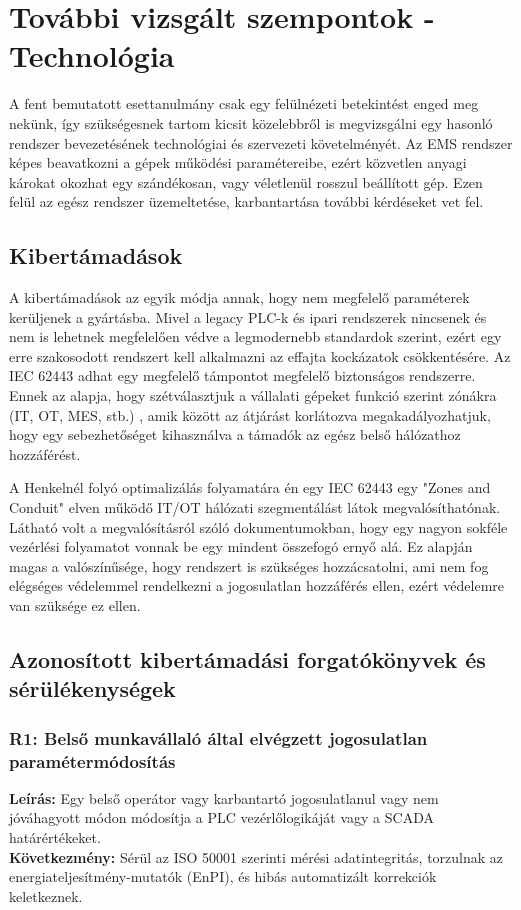 \section{További vizsgált szempontok - Technológia}
A fent bemutatott esettanulmány csak egy felülnézeti betekintést enged meg nekünk, így szükségesnek tartom kicsit közelebbről is megvizsgálni egy hasonló rendszer bevezetésének technológiai és szervezeti követelményét. Az EMS rendszer képes beavatkozni a gépek működési paramétereibe, ezért közvetlen anyagi károkat okozhat egy szándékosan, vagy véletlenül rosszul beállított gép. Ezen felül az egész rendszer üzemeltetése, karbantartása további kérdéseket vet fel.

\subsection*{Kibertámadások}
A kibertámadások az egyik módja annak, hogy nem megfelelő paraméterek kerüljenek a gyártásba. Mivel a legacy PLC-k és ipari rendszerek nincsenek és nem is lehetnek megfelelően védve a legmodernebb standardok szerint, ezért egy erre szakosodott rendszert kell alkalmazni az effajta kockázatok csökkentésére. Az IEC 62443 adhat egy megfelelő támpontot megfelelő biztonságos rendszerre. Ennek az alapja, hogy szétválasztjuk a vállalati gépeket funkció szerint zónákra (IT, OT, MES, stb.) , amik között az átjárást korlátozva megakadályozhatjuk, hogy egy sebezhetőséget kihasználva a támadók az egész belső hálózathoz hozzáférést.

A Henkelnél folyó optimalizálás folyamatára én egy IEC 62443 egy "Zones and Conduit" elven működő IT/OT hálózati szegmentálást látok megvalósíthatónak. Látható volt a megvalósításról szóló dokumentumokban, hogy egy nagyon sokféle vezérlési folyamatot vonnak be egy mindent összefogó ernyő alá. Ez alapján magas a valószínűsége, hogy rendszert is szükséges hozzácsatolni, ami nem fog elégséges védelemmel rendelkezni a jogosulatlan hozzáférés ellen, ezért védelemre van szüksége ez ellen.
\subsection*{Azonosított kibertámadási forgatókönyvek és sérülékenységek} 
\subsubsection*{R1: Belső munkavállaló által elvégzett jogosulatlan paramétermódosítás} 
\textbf{Leírás:} Egy belső operátor vagy karbantartó jogosulatlanul vagy nem jóváhagyott módon módosítja a PLC vezérlőlogikáját vagy a SCADA határértékeket.  \\\textbf{Következmény:} Sérül az ISO 50001 szerinti mérési adatintegritás, torzulnak az energiateljesítmény-mutatók (EnPI), és hibás automatizált korrekciók keletkeznek.
